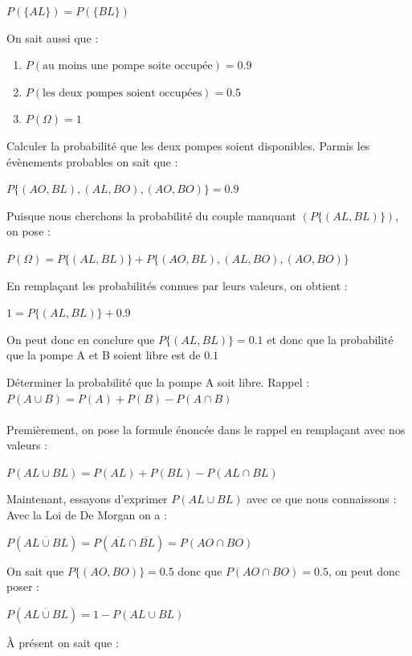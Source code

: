 \begin{exo}
		\begin{center}$P(\{AL\}) = P(\{BL\})$\end{center}
		On sait aussi que :
		\begin{enumerate}
			\item[ ] $P(\text{au moins une pompe soite occupée}) = 0.9$
			\item[ ] $P(\text{les deux pompes soient occupées}) = 0.5$
			\item[ ] $P(\Omega) = 1$
		\end{enumerate}
		\begin{subexo}{Calculer la probabilité que les deux pompes soient disponibles.}
			Parmis les évènements probables on sait que : 
			\begin{center}$P\{(AO,BL),(AL,BO),(AO,BO)\} = 0.9$\end{center}
			Puisque nous cherchons la probabilité du couple manquant $(P\{(AL,BL)\})$, on pose :
			\begin{center}$P(\Omega) = P\{(AL,BL)\} + P\{(AO,BL),(AL,BO),(AO,BO)\}$\end{center}
			En remplaçant les probabilités connues par leurs valeurs, on obtient :
			\begin{center}$1 = P\{(AL,BL)\} + 0.9$\end{center}
			On peut donc en conclure que $P\{(AL,BL)\}  = 0.1$ et donc que la probabilité que la pompe A et B soient libre est de $0.1$
		\end{subexo}
	\begin{subexo}{Déterminer la probabilité que la pompe A soit libre.}
		Rappel : $P(A\cup B) = P(A) + P(B) - P(A \cap B)$ \\ \\ 
		Premièrement, on pose la formule énoncée dans le rappel en remplaçant avec nos valeurs :
		\begin{center}$P(AL\cup BL) = P(AL) + P(BL) - P(AL \cap BL)$\end{center}
		Maintenant, essayons d'exprimer $P(AL\cup BL)$ avec ce que nous connaissons : \\
		Avec la Loi de De Morgan on a : 
		\begin{center}$P(\overline{AL\cup BL}) = P(\overline{AL} \cap \overline{BL}) = P(AO \cap BO)$\end{center}	
		On sait que $P\{(AO,BO)\}=0.5$ donc que $P(AO \cap BO)=0.5$, on peut donc poser :
		\begin{center}$P(\overline{AL\cup BL}) = 1 - P(AL \cup BL)$\end{center}
		À présent on sait que :

\end{subexo}
\end{exo}
